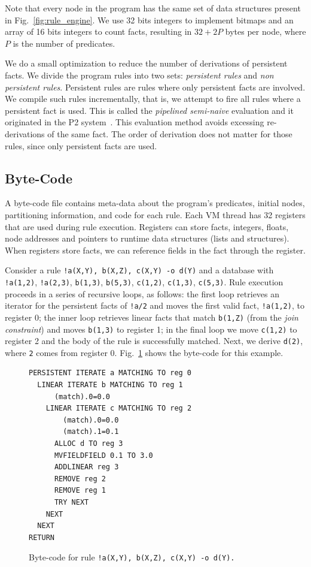 Note that every node in the program has the same set of data structures present in Fig.~\ref{fig:rule_engine}.
We use 32 bits integers to implement bitmaps and an array of 16 bits integers to count facts, resulting in
$32 + 2P$ bytes per node, where $P$ is the number of predicates.

We do a small optimization to reduce the number of derivations of persistent facts. We
divide the program rules into two sets: \emph{persistent rules} and \emph{non persistent rules}.
Persistent rules are rules where only persistent facts are involved. We compile such rules
incrementally, that is, we attempt to fire all rules where a persistent fact is used. This is called
the \emph{pipelined semi-naive} evaluation and it originated in the P2 system~\cite{Loo-condie-garofalakis-p2}.
This evaluation method avoids excessing re-derivations of the same fact. The order of derivation does not matter for those rules, since
only persistent facts are used.

\subsection{Byte-Code}

A byte-code file contains meta-data about the program's predicates, initial nodes, partitioning
information, and code for each rule.
Each VM thread has 32 registers that are used during rule execution.
Registers can store facts, integers, floats, node addresses and pointers to runtime 
data structures (lists and structures). When registers store facts, we can reference
fields in the fact through the register.

Consider a rule \texttt{!a(X,Y), b(X,Z), c(X,Y) -o d(Y)} and a database with
\texttt{!a(1,2)}, \texttt{!a(2,3)}, \texttt{b(1,3)}, \texttt{b(5,3)}, \texttt{c(1,2)}, \texttt{c(1,3)},
\texttt{c(5,3)}. Rule execution proceeds in a series of recursive loops, as follows: the first loop retrieves an
iterator for the persistent facts of \texttt{!a/2} and moves the first valid fact, \texttt{!a(1,2)},
to register 0; the inner loop retrieves linear facts that match \texttt{b(1,Z)} (from the
\emph{join constraint}) and moves \texttt{b(1,3)} to register 1; in the final
loop we move \texttt{c(1,2)} to register 2 and the body of the rule is successfully matched. Next, we
derive \texttt{d(2)}, where \texttt{2} comes from register 0.
Fig.~\ref{fig:byte_code} shows the byte-code for this example.

\begin{figure}[]
\scriptsize\begin{Verbatim}
PERSISTENT ITERATE a MATCHING TO reg 0
  LINEAR ITERATE b MATCHING TO reg 1
      (match).0=0.0
    LINEAR ITERATE c MATCHING TO reg 2
        (match).0=0.0
        (match).1=0.1
      ALLOC d TO reg 3
      MVFIELDFIELD 0.1 TO 3.0
      ADDLINEAR reg 3
      REMOVE reg 2
      REMOVE reg 1
      TRY NEXT
    NEXT
  NEXT
RETURN
\end{Verbatim}
\caption{\small{Byte-code for rule \texttt{!a(X,Y), b(X,Z), c(X,Y) -o d(Y).}}}
\label{fig:byte_code}
\end{figure}

